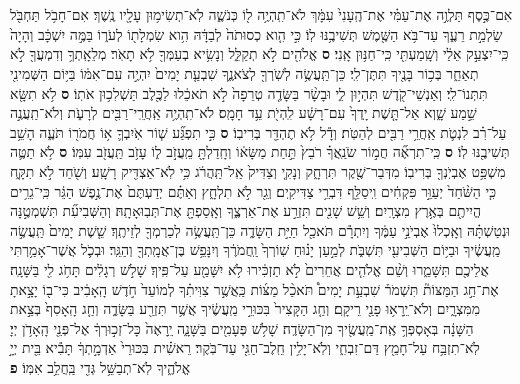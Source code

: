 \documentclass[twoside, openany, parskip=half, 11pt]{book}
\begin{document}
\begin{footnotesize}
\begin{multicols}{2}
\\
\\
אִם־כֶּ֣סֶף תַּלְוֶ֣ה אֶת־עַמִּ֗י אֶת־הֶֽעָנִי֙ עִמָּ֔ךְ לֹא־תִֽהְיֶ֥ה ל֖וֹ כְּנֹשֶׁ֑ה לֹֽא־תְשִׂימ֥וּן עָלָ֖יו נֶֽשֶׁךְ׃ אִם־חָבֹ֥ל תַּחְבֹּ֖ל שַׂלְמַ֣ת רֵעֶ֑ךָ עַד־בֹּ֥א הַשֶּׁ֖מֶשׁ תְּשִׁיבֶ֥נּוּ לֽוֹ׃ כִּ֣י הִ֤וא כְסוּתֹה֙ לְבַדָּ֔הּ הִ֥וא שִׂמְלָת֖וֹ לְעֹר֑וֹ בַּמֶּ֣ה יִשְׁכָּ֔ב וְהָיָה֙ כִּֽי־יִצְעַ֣ק אֵלַ֔י וְשָֽׁמַעְתִּ֖י כִּֽי־חַנּ֥וּן אָֽנִי׃ \textbf{ס} 
 אֱלֹהִ֖ים לֹ֣א תְקַלֵּ֑ל וְנָשִׂ֥יא בְעַמְּךָ֖ לֹ֥א תָאֹֽר׃ מְלֵאָֽתְךָ֥ וְדִמְעֲךָ֖ לֹ֣א תְאַחֵ֑ר בְּכ֥וֹר בָּנֶ֖יךָ תִּתֶּן־לִֽי׃ כֵּן־תַּֽעֲשֶׂ֥ה לְשֹֽׁרְךָ֖ לְצֹאנֶ֑ךָ שִׁבְעַ֤ת יָמִים֙ יִהְיֶ֣ה עִם־אִמּ֔וֹ בַּיּ֥וֹם הַשְּׁמִינִ֖י תִּתְּנוֹ־לִֽי׃ וְאַנְשֵׁי־קֹ֖דֶשׁ תִּהְי֣וּן לִ֑י וּבָשָׂ֨ר בַּשָּׂדֶ֤ה טְרֵפָה֙ לֹ֣א תֹאכֵ֔לוּ לַכֶּ֖לֶב תַּשְׁלִכ֥וּן אֹתֽוֹ׃ \textbf{ס} לֹ֥א תִשָּׂ֖א שֵׁ֣מַע שָׁ֑וְא אַל־תָּ֤שֶׁת יָֽדְךָ֙ עִם־רָשָׁ֔ע לִֽהְיֹ֖ת עֵ֥ד חָמָֽס׃ לֹא־תִֽהְיֶ֥ה אַֽחֲרֵֽי־רַבִּ֖ים לְרָעֹ֑ת וְלֹא־תַֽעֲנֶ֣ה עַל־רִ֗ב לִנְטֹ֛ת אַֽחֲרֵ֥י רַבִּ֖ים לְהַטֹּֽת׃ וְדָ֕ל לֹ֥א תֶהְדַּ֖ר בְּרִיבֽוֹ׃ \textbf{ס} כִּ֣י תִפְגַּ֞ע שׁ֧וֹר אֹֽיִבְךָ֛ א֥וֹ חֲמֹר֖וֹ תֹּעֶ֑ה הָשֵׁ֥ב תְּשִׁיבֶ֖נּוּ לֽוֹ׃ \textbf{ס} כִּֽי־תִרְאֶ֞ה חֲמ֣וֹר שֹׂנַֽאֲךָ֗ רֹבֵץ֙ תַּ֣חַת מַשָּׂא֔וֹ וְחָֽדַלְתָּ֖ מֵֽעֲזֹ֣ב ל֑וֹ עָזֹ֥ב תַּֽעֲזֹ֖ב עִמּֽוֹ׃ \textbf{ס} 
 לֹ֥א תַטֶּ֛ה מִשְׁפַּ֥ט אֶבְיֹֽנְךָ֖ בְּרִיבֽוֹ׃ מִדְּבַר־שֶׁ֖קֶר תִּרְחָ֑ק וְנָקִ֤י וְצַדִּיק֙ אַֽל־תַּֽהֲרֹ֔ג כִּ֥י לֹֽא־אַצְדִּ֖יק רָשָֽׁע׃ וְשֹׁ֖חַד לֹ֣א תִקָּ֑ח כִּ֤י הַשֹּׁ֨חַד֙ יְעַוֵּ֣ר פִּקְחִ֔ים וִֽיסַלֵּ֖ף דִּבְרֵ֥י צַדִּיקִֽים׃ וְגֵ֖ר לֹ֣א תִלְחָ֑ץ וְאַתֶּ֗ם יְדַעְתֶּם֙ אֶת־נֶ֣פֶשׁ הַגֵּ֔ר כִּֽי־גֵרִ֥ים הֱיִיתֶ֖ם בְּאֶ֥רֶץ מִצְרָֽיִם׃ וְשֵׁ֥שׁ שָׁנִ֖ים תִּזְרַ֣ע אֶת־אַרְצֶ֑ךָ וְאָֽסַפְתָּ֖ אֶת־תְּבֽוּאָתָֽהּ׃ וְהַשְּׁבִיעִ֞ת תִּשְׁמְטֶ֣נָּה וּנְטַשְׁתָּ֗הּ וְאָֽכְלוּ֙ אֶבְיֹנֵ֣י עַמֶּ֔ךָ וְיִתְרָ֕ם תֹּאכַ֖ל חַיַּ֣ת הַשָּׂדֶ֑ה כֵּן־תַּֽעֲשֶׂ֥ה לְכַרְמְךָ֖ לְזֵיתֶֽךָ׃ שֵׁ֤שֶׁת יָמִים֙ תַּֽעֲשֶׂ֣ה מַֽעֲשֶׂ֔יךָ וּבַיּ֥וֹם הַשְּׁבִיעִ֖י תִּשְׁבֹּ֑ת לְמַ֣עַן יָנ֗וּחַ שֽׁוֹרְךָ֙ וַֽחֲמֹרֶ֔ךָ וְיִנָּפֵ֥שׁ בֶּן־אֲמָֽתְךָ֖ וְהַגֵּֽר׃ וּבְכֹ֛ל אֲשֶׁר־אָמַ֥רְתִּי אֲלֵיכֶ֖ם תִּשָּׁמֵ֑רוּ וְשֵׁ֨ם אֱלֹהִ֤ים אֲחֵרִים֙ לֹ֣א תַזְכִּ֔ירוּ לֹ֥א יִשָּׁמַ֖ע עַל־פִּֽיךָ׃ שָׁלֹ֣שׁ רְגָלִ֔ים תָּחֹ֥ג לִ֖י בַּשָּׁנָֽה׃ אֶת־חַ֣ג הַמַּצּוֹת֘ תִּשְׁמֹר֒ שִׁבְעַ֣ת יָמִים֩ תֹּאכַ֨ל מַצּ֜וֹת כַּֽאֲשֶׁ֣ר צִוִּיתִ֗ךָ לְמוֹעֵד֙ חֹ֣דֶשׁ הָֽאָבִ֔יב כִּי־ב֖וֹ יָצָ֣אתָ מִמִּצְרָ֑יִם וְלֹא־יֵֽרָא֥וּ פָנַ֖י רֵיקָֽם׃ וְחַ֤ג הַקָּצִיר֙ בִּכּוּרֵ֣י מַֽעֲשֶׂ֔יךָ אֲשֶׁ֥ר תִּזְרַ֖ע בַּשָּׂדֶ֑ה וְחַ֤ג הָֽאָסִף֙ בְּצֵ֣את הַשָּׁנָ֔ה בְּאָסְפְּךָ֥ אֶֽת־מַֽעֲשֶׂ֖יךָ מִן־הַשָּׂדֶֽה׃ שָׁלֹ֥שׁ פְּעָמִ֖ים בַּשָּׁנָ֑ה יֵֽרָאֶה֙ כָּל־זְכ֣וּרְךָ֔ אֶל־פְּנֵ֖י הָֽאָדֹ֥ן יְיָ׃ לֹֽא־תִזְבַּ֥ח עַל־חָמֵ֖ץ דַּם־זִבְחִ֑י וְלֹֽא־יָלִ֥ין חֵֽלֶב־חַגִּ֖י עַד־בֹּֽקֶר׃ רֵאשִׁ֗ית בִּכּוּרֵי֙ אַדְמָ֣תְךָ֔ תָּבִ֕יא בֵּ֖ית יְיָ֣ אֱלֹהֶ֑יךָ לֹֽא־תְבַשֵּׁ֥ל גְּדִ֖י בַּֽחֲלֵ֥ב אִמּֽוֹ׃ \textbf{פ} 


\end{multicols}
\end{footnotesize}
\end{document}
